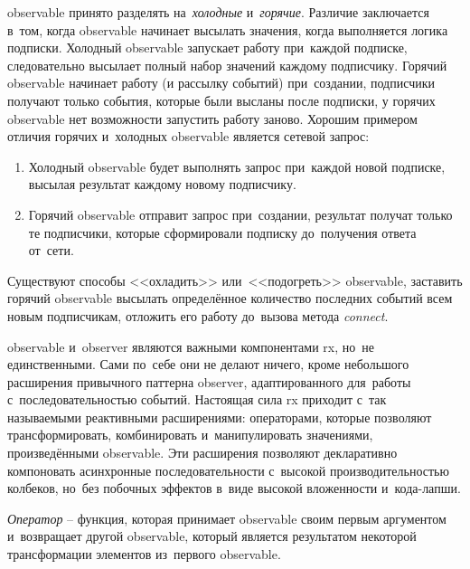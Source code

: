 \gls{observable} принято разделять на~\emph{холодные} и~\emph{горячие}. Различие заключается в~том, когда \gls{observable} начинает высылать значения, когда выполняется логика подписки. Холодный \gls{observable} запускает работу при~каждой подписке, следовательно высылает полный набор значений каждому подписчику. Горячий \gls{observable} начинает работу (и рассылку событий) при~создании, подписчики получают только события, которые были высланы после подписки, у горячих \gls{observable} нет возможности запустить работу заново. Хорошим примером отличия горячих и~холодных \gls{observable} является сетевой запрос:

\begin{enumerate}
	\item Холодный \gls{observable} будет выполнять запрос при~каждой новой подписке, высылая результат каждому новому подписчику.
	\item Горячий \gls{observable} отправит запрос при~создании, результат получат только те подписчики, которые сформировали подписку до~получения ответа от~сети.
\end{enumerate}

Существуют способы <<охладить>> или~<<подогреть>> \gls{observable}, заставить горячий \gls{observable} высылать определённое количество последних событий всем новым подписчикам, отложить его работу до~вызова метода \textit{connect}.

\gls{observable} и~\gls{observer} являются важными компонентами \gls{rx}, но~не единственными. Сами по~себе они не делают ничего, кроме небольшого расширения привычного паттерна \gls{observer}, адаптированного для~работы с~последовательностью событий. Настоящая сила \gls{rx} приходит с~так называемыми реактивными расширениями: операторами, которые позволяют трансформировать, комбинировать и~манипулировать значениями, произведёнными \gls{observable}. Эти расширения позволяют декларативно компоновать асинхронные последовательности с~высокой производительностью колбеков, но~без побочных эффектов в~виде высокой вложенности и~кода-лапши.

\emph{Оператор} -- функция, которая принимает \gls{observable} своим первым аргументом и~возвращает другой \gls{observable}, который является результатом некоторой трансформации элементов из~первого \gls{observable}.